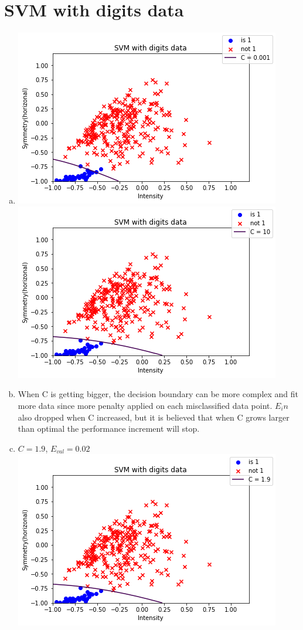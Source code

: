 \documentclass{article}
\def\math#1{$#1$}
\begin{document}
\section{SVM with digits data}

\begin{enumerate}[a)]
    \item \includegraphics[]{4/1} \\ \includegraphics[]{4/2}
    \item When C is getting bigger, the decision boundary can be more complex and fit more data since more penalty applied on each misclassified data point. \math{E_in} also dropped when C increased, but it is believed that when C grows larger than optimal the performance increment will stop.
    \item \math{C = 1.9}, \math{E_{val} = 0.02} \\ \includegraphics[]{4/3}
\end{enumerate}
\end{document}
